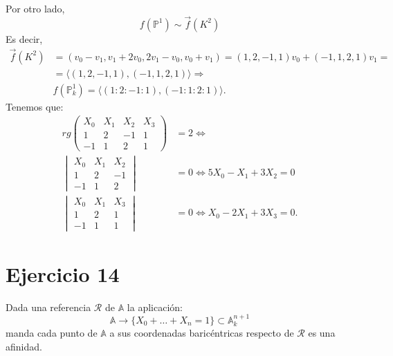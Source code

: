 \documentclass[10pt,a4paper,openright]{book}
\theoremstyle{break}
\begin{document}
Por otro lado, 
\[
f\left( \mathbb{P}^{1} \right) \sim \overrightarrow{f} \left( K^2 \right) 
\]
Es decir, 
\begin{align*}
    \overrightarrow{f} \left( K^2 \right) &= \left( v_0 - v_1, v_1 + 2v_0, 2v_1 - v_0, v_0 + v_1 \right) = \left( 1, 2, -1, 1 \right) v_0 + \left( -1, 1, 2, 1 \right) v_1 = \\
    &= \langle \left( 1, 2, -1, 1 \right), \left( -1, 1, 2, 1 \right) \rangle \Rightarrow \\
    &f\left( \mathbb{P}^{1}_{k} \right) = \langle \left( 1 : 2 : -1 : 1 \right), \left( -1 : 1 : 2 : 1 \right) \rangle
.\end{align*}
Tenemos que: 
\begin{align*}
    rg \begin{pmatrix} X_0 & X_1 & X_2 & X_3\\ 1 & 2 & -1 & 1\\ -1 & 1 & 2 & 1 \end{pmatrix} &= 2 \Leftrightarrow\\
    \begin{vmatrix} X_0 & X_1 & X_2\\ 1 & 2 & -1\\ -1 & 1 & 2 \end{vmatrix} &= 0 \Leftrightarrow 5X_0 - X_1 + 3X_2 = 0\\
    \begin{vmatrix} X_0 & X_1 & X_3\\ 1 & 2 & 1\\ -1 & 1 & 1 \end{vmatrix} &= 0 \Leftrightarrow X_0 - 2X_1 + 3X_3 = 0
.\end{align*}

\section{Ejercicio 14}%
\label{sec:ejercicio_14}
Dada una referencia $\mathcal{R}$ de $\mathbb{A}$ la aplicación: 
\[
\mathbb{A} \rightarrow \{X_0 + \ldots + X_n = 1\} \subset \mathbb{A}^{n+1}_k 
\]
manda cada punto de $\mathbb{A}$ a sus coordenadas baricéntricas respecto de $\mathcal{R}$ es una afinidad. 
\end{document}
